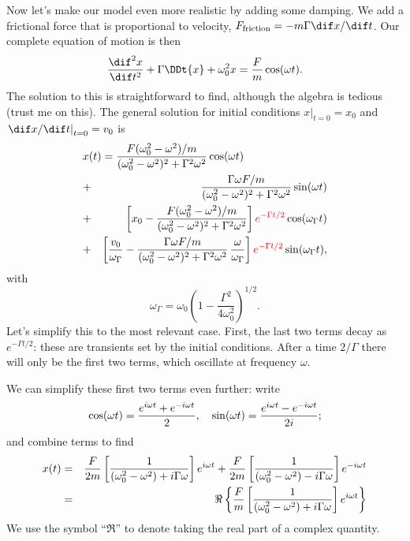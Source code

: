 Now let's make our model even more realistic by adding some damping.  We add a frictional force that is proportional to velocity, $F_{\mathrm{friction}} = -m\Gamma \dif x/\dif t$. Our complete equation of motion is then
\begin{equation}
	\DDtt{x} + \Gamma \DDt{x} + \omega_{0}^{2}x = \frac{F}{m}\cos(\omega t).
\end{equation}
The solution to this is straightforward to find, although the algebra is tedious (trust me on this). The general solution for initial conditions $\left.x\right|_{t=0} = x_{0}$ and $\left.\dif x/\dif t\right|_{t=0} = v_{0}$ is
\begin{eqnarray}
\label{e.general-solution-ddo}
\lefteqn{x(t) = \frac{F\womw/m}{\womw^{2}+\gw}\cos(\omega t)} && \\
	&+& \frac{\Gamma\omega F/m}{\womw^{2}+\gw}\sin(\omega t)\nonumber \\
	&+& \left[x_{0}-\frac{F\womw/m}{\womw^{2}+\gw}\right]{\color{red}e^{-\Gamma t/2}} \cos(\omega_{\Gamma}t) \nonumber\\
	&+& \left[\frac{v_{0}}{\omega_{\Gamma}}-\frac{\Gamma\omega F/m}{\womw^{2}+\gw}
	\,\frac{\omega}{\omega_{\Gamma}}\right]{\color{red}e^{-\Gamma t/2}} \sin(\omega_{\Gamma}t), 
	\nonumber
\end{eqnarray}
with
\[ 
    \omega_{\Gamma} = 
        \omega_{0}\left(1-\frac{\Gamma^{2}}{4\omega_{0}^{2}}\right)^{1/2}.
\]
Let's simplify this to the most relevant case.  First, the last two terms decay as {\color{red}$e^{-\Gamma t/2}$}: these are transients set by the initial conditions. After a time $2/\Gamma$ there will only be the first two terms, which oscillate at frequency $\omega$. 

We can simplify these first two terms even further: write
\[ \cos(\omega t) = \frac{e^{i\omega t}+e^{-i\omega t}}{2},\quad \sin(\omega t) 
    = \frac{e^{i\omega t}-e^{-i\omega t}}{2i}; \]
and combine terms to find
\begin{eqnarray}
    x(t) &=& \frac{F}{2m}\left[\frac{1}{\left(\omega_0^2-\omega^2\right) + i\Gamma\omega}\right]e^{i\omega t} + \frac{F}{2m}\left[\frac{1}{\left(\omega_0^2-\omega^2\right) - i\Gamma\omega}\right]e^{-i\omega t} \nonumber\\
    &=& \Re\left\{\frac{F}{m}\left[\frac{1}{\left(\omega_0^2-\omega^2\right) + i\Gamma\omega}\right]e^{i\omega t}\right\}\label{e.oscillator-expression}
\end{eqnarray}
We use the symbol ``$\Re$'' to denote taking the real part of a complex quantity.  

